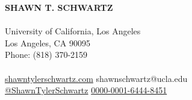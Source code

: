 \documentclass[margin]{res}
\begin{document}
	\thispagestyle{empty}
	{\LARGE\bf SHAWN T. SCHWARTZ} \\ \\
	University of California, Los Angeles \\
	Los Angeles, CA 90095 \\
	Phone: (818) 370-2159 \\ \\
	 {\href{https://shawntylerschwartz.com}{shawntylerschwartz.com}}
	 shawnschwartz@ucla.edu \\
	 {\href{https://github.com/ShawnTylerSchwartz} {@ShawnTylerSchwartz}}
	\hspace{0.1cm}  {\href{https://orcid.org/0000-0001-6444-8451}{0000-0001-6444-8451}}
	\vspace{-0.5cm}
	
\end{document}
